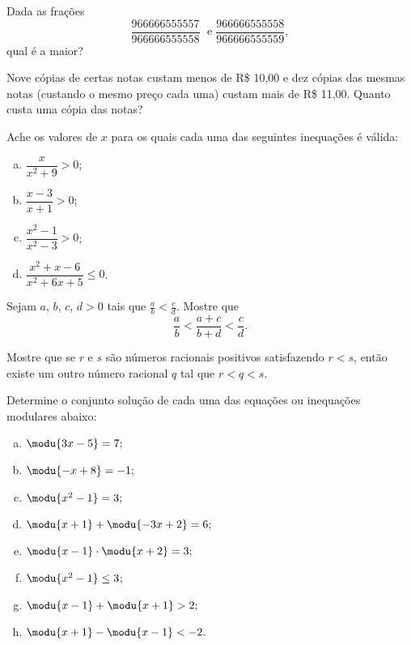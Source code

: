 \begin{exercise}
Dada as frações $$\frac{966666555557}{966666555558} \; \text{ e
} \; \frac{966666555558}{966666555559},$$ qual é a maior?
\end{exercise}


\begin{exercise}
Nove cópias de certas notas custam menos de R\$ 10,00 e dez
cópias das mesmas notas (custando o mesmo preço cada uma) custam
mais de R\$ 11,00. Quanto custa uma cópia das notas? 
\end{exercise}

\begin{exercise}
Ache os valores de $x$ para os quais cada uma das seguintes
inequações é válida:
\begin{enumerate}[a)]
  \item $\dfrac x {x^2+9} > 0$;
  \item $\dfrac{x-3}{x+1} > 0$;
  \item $\dfrac{x^2-1}{x^2-3} > 0$;
  \item $\dfrac{x^2+x-6}{x^2+6x+5} \leq 0$.
\end{enumerate}
\end{exercise}

\begin{exercise}
Sejam  $a$, $b$, $c$, $d > 0$ tais que $\frac a b < \frac c d$.
Mostre que $$\frac a b < \frac {a+c} {b+d} < \frac c d.$$
\end{exercise}

\begin{exercise}
  Mostre que se $r$ e $s$ são números racionais positivos satisfazendo $r < s$,
  então existe um outro número racional $q$ tal que $r<q<s$.
\end{exercise}

\begin{exercise}
Determine o conjunto solução de cada uma das equações ou
inequações modulares abaixo:
\begin{enumerate}[a)]
  \item $\modu {3x - 5}= 7;$
  \item $\modu {-x +8} = -1;$
  \item $\modu{x^2 - 1}= 3;$
  \item $\modu{x +1} + \modu { -3x +2} = 6;$
  \item $\modu{x-1} \cdot \modu{x+2} = 3;$
  \item $\modu{x^2-1}\le 3$;
  \item $\modu{x-1}+ \modu{x+1}>2;$
  \item $\modu{x+1}- \modu{x-1}<-2.$
\end{enumerate}
\end{exercise}

